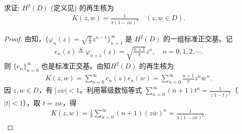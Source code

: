 \documentclass[../../main.tex]{subfiles}%
\begin{document}
\begin{example}
求证: $H^2(D)$ (定义见) 的再生核为
\begin{align*}
K(z,w) = \frac{1}{\pi(1 - z\overline{w})^2} \quad (z,w \in D).
\end{align*}
\end{example}
\begin{proof}
由知，$\{\varphi_n(z)=\sqrt{\frac{n}{\pi}}z^{n-1}\}_{n=1}^{\infty}$ 是 $H^2(D)$ 的一组标准正交基。记
\begin{align}
e_n(z)\triangleq \varphi_{n+1}(z)=\sqrt{\frac{n+1}{\pi}}z^n,\quad n=0,1,2,\cdots. \label{example:en}
\end{align}
则 $\{e_n\}_{n=0}^{\infty}$ 也是标准正交基。由知$H^2(D)$ 的再生核为
\begin{align}
K(z,w)=\sum_{n=0}^{\infty} e_n(z)\overline{e_n(w)}
=\sum_{n=0}^{\infty} \frac{n+1}{\pi} z^n \overline{w}^{\,n}. \label{example:kernel:series}
\end{align}
因 $z,w\in D$，有 $|z\overline{w}|<1$。利用幂级数恒等式 $\sum\limits_{n=0}^{\infty}(n+1)t^n=\frac{1}{(1-t)^2}$（$|t|<1$），取 $t=z\overline{w}$，得
\begin{align*}
K(z,w)=\frac{1}{\pi}\sum_{n=0}^{\infty}(n+1)(z\overline{w})^n
=\frac{1}{\pi(1-z\overline{w})^2}.
\end{align*}
\end{proof}
\end{document}
